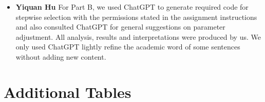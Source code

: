 \begin{itemize}
    For Part B, we used ChatGPT to insert some value from lists into latex tables, but we made sure that all values lined up.


    \item \textbf{Yiquan Hu}\newline
    For Part B, we used ChatGPT to generate required code for stepwise selection with the permissions stated in the assignment instructions and also consulted ChatGPT for general suggestions on parameter adjustment. All analysis, results and interpretations were produced by us. We only used ChatGPT lightly refine the academic word of some sentences without adding new content.
    
\end{itemize}

\section{Additional Tables}

